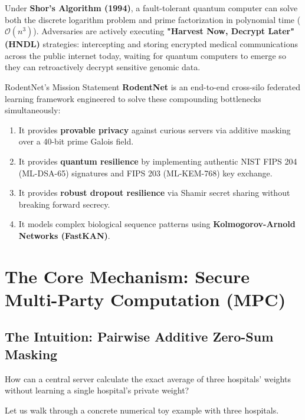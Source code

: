 \documentclass[11pt,a4paper]{report}
\begin{document}
Under \textbf{Shor's Algorithm (1994)}, a fault-tolerant quantum computer can solve both the discrete logarithm problem and prime factorization in polynomial time ($\mathcal{O}(n^3)$). Adversaries are actively executing \textbf{"Harvest Now, Decrypt Later" (HNDL)} strategies: intercepting and storing encrypted medical communications across the public internet today, waiting for quantum computers to emerge so they can retroactively decrypt sensitive genomic data.

\begin{infobox}{RodentNet's Mission Statement}
\textbf{RodentNet} is an end-to-end cross-silo federated learning framework engineered to solve these compounding bottlenecks simultaneously:
\begin{enumerate}[itemsep=1pt]
  \item It provides \textbf{provable privacy} against curious servers via additive masking over a 40-bit prime Galois field.
  \item It provides \textbf{quantum resilience} by implementing authentic NIST FIPS 204 (ML-DSA-65) signatures and FIPS 203 (ML-KEM-768) key exchange.
  \item It provides \textbf{robust dropout resilience} via Shamir secret sharing without breaking forward secrecy.
  \item It models complex biological sequence patterns using \textbf{Kolmogorov-Arnold Networks (FastKAN)}.
\end{enumerate}
\end{infobox}

\chapter{The Core Mechanism: Secure Multi-Party Computation (MPC)}
\label{chap:mpc}

\section{The Intuition: Pairwise Additive Zero-Sum Masking}
How can a central server calculate the exact average of three hospitals' weights without learning a single hospital's private weight?

Let us walk through a concrete numerical toy example with three hospitals.
\end{document}
